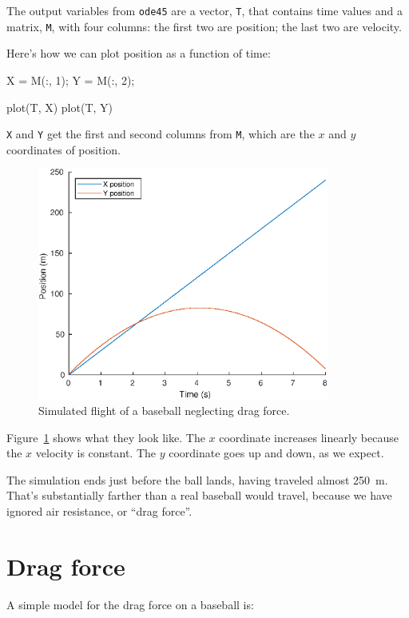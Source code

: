 \documentclass[
]{book}
\numberwithin{Answer}{chapter}
\numberwithin{Exercise}{chapter}
\begin{document}
The output variables from {\tt ode45} are a vector, 
{\tt T}, that contains time values and a matrix, {\tt M}, with four columns: the first two are position; the last two are velocity.

Here's how we can plot position as a function of time:

\begin{code}
	X = M(:, 1);
    Y = M(:, 2);
    
    plot(T, X)
    plot(T, Y)
\end{code}

{\tt X} and {\tt Y} get the first and second columns from {\tt M}, which are the $x$ and $y$ coordinates of position.

\begin{figure}
\centerline{\includegraphics[height=3in]{book/figs/baseball1.eps}}
\caption{Simulated flight of a baseball neglecting drag force.}
\label{fig:baseball1}
\end{figure}

Figure~\ref{fig:baseball1} shows what they look like.  The $x$ coordinate increases linearly because the $x$ velocity is constant.  The $y$ coordinate goes up and down, as we expect.

The simulation ends just before the ball lands, having traveled almost \SI{250}{\meter}.  That's substantially farther than a real baseball would travel, because we have ignored air resistance, or ``drag force''.


\section{Drag force}
\label{sect:drag}


A simple model for the drag force on a baseball is:
\end{document}
